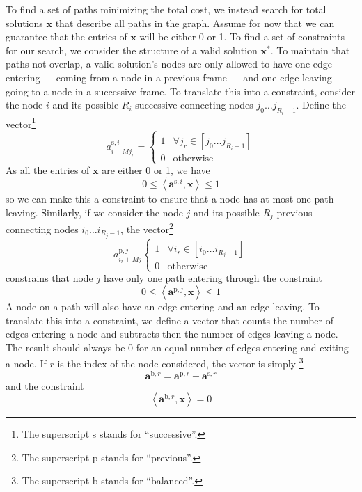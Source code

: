\documentclass{article}
\begin{document}
\begin{sloppy}
To find a set of paths minimizing the total cost, we instead search for total
solutions $\boldsymbol{x}$ that describe all paths in the graph. Assume for now
that we can guarantee that the entries of $\boldsymbol{x}$ will be either 0 or
1. To find a set of constraints for our search, we consider the structure of a
valid solution $\boldsymbol{x}^{\ast}$. To maintain that paths not overlap, a
valid solution's nodes are only allowed to have one edge entering ---
coming from a node in a previous frame --- and one edge leaving
--- going to a node in a successive frame. To translate this into a
constraint, consider the node $i$ and its possible $R_{i}$ successive connecting
nodes $j_{0} \dotsc j_{R_{i}-1}$. Define the vector\footnote{The superscript s
stands for ``successive''.}
\[
    a^{\text{s},i}_{i + Mj_{r}} = \begin{cases}
        1 & \forall j_{r} \in \left[ j_{0} \dotsc j_{R_{i}-1} \right] \\
        0 & \text{otherwise}
    \end{cases}
\]
As all the entries of $\boldsymbol{x}$ are either 0 or 1, we have
\[
    0 \leq \left\langle \boldsymbol{a}^{\text{s},i}, \boldsymbol{x} \right\rangle \leq 1
\]
so we can make this a constraint to ensure that a node has at most one path
leaving. Similarly, if we consider the node $j$ and its possible $R_{j}$ previous connecting
nodes $i_{0} \dotsc i_{R_{j}-1}$, the vector\footnote{The superscript p
stands for ``previous''.}
\[
    a^{\text{p},j}_{i_{r} + Mj} \begin{cases}
        1 & \forall i_{r} \in \left[ i_{0} \dotsc i_{R_{j}-1} \right] \\
        0 & \text{otherwise}
    \end{cases}
\]
constrains that node $j$ have only one path entering through the constraint
\[
    0 \leq \left\langle \boldsymbol{a}^{\text{p},j} , \boldsymbol{x} \right\rangle \leq 1
\]
A node on a path will also have an edge entering and an edge leaving. To
translate this into a constraint, we define a vector that counts the number of
edges entering a node and subtracts then the number of edges leaving a node. The
result should always be 0 for an equal number of edges entering and exiting a
node. If $r$ is the index of the node considered, the vector is simply
\footnote{The superscript b stands for ``balanced''.}
\[
    \boldsymbol{a}^{\text{b},r} = \boldsymbol{a}^{\text{p},r} -
    \boldsymbol{a}^{\text{s},r}
\]
and the constraint
\[
    \left\langle \boldsymbol{a}^{\text{b},r}, \boldsymbol{x} \right\rangle = 0
\]
\end{sloppy}
\end{document}

